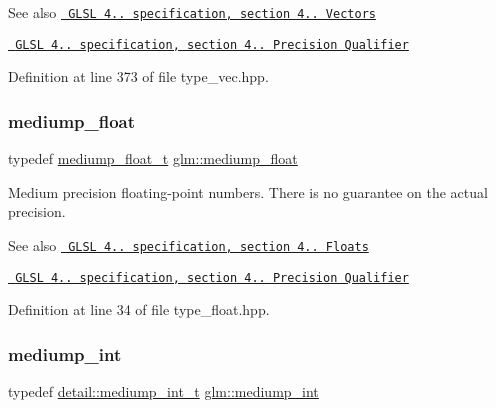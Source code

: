 \begin{DoxySeeAlso}{See also}
\href{http://www.opengl.org/registry/doc/GLSLangSpec.4.20.8.pdf}{\texttt{ G\+L\+SL 4.. specification, section 4.. Vectors}} 

\href{http://www.opengl.org/registry/doc/GLSLangSpec.4.20.8.pdf}{\texttt{ G\+L\+SL 4.. specification, section 4.. Precision Qualifier}} 
\end{DoxySeeAlso}


Definition at line 373 of file type\+\_\+vec.\+hpp.

\mbox{\label{group__core__precision_gac785826c039fe6c97c03b37c81c1a68e}} 
\subsubsection{\texorpdfstring{mediump\_float}{mediump\_float}}
{\footnotesize\ttfamily typedef \mbox{\hyperlink{namespaceglm_aec127979a2b6edbf05b485cb4e8c47cc}{mediump\+\_\+float\+\_\+t}} \mbox{\hyperlink{group__core__precision_gac785826c039fe6c97c03b37c81c1a68e}{glm\+::mediump\+\_\+float}}}

Medium precision floating-\/point numbers. There is no guarantee on the actual precision.

\begin{DoxySeeAlso}{See also}
\href{http://www.opengl.org/registry/doc/GLSLangSpec.4.20.8.pdf}{\texttt{ G\+L\+SL 4.. specification, section 4.. Floats}} 

\href{http://www.opengl.org/registry/doc/GLSLangSpec.4.20.8.pdf}{\texttt{ G\+L\+SL 4.. specification, section 4.. Precision Qualifier}} 
\end{DoxySeeAlso}


Definition at line 34 of file type\+\_\+float.\+hpp.

\mbox{\label{group__core__precision_ga2a3dcbcd7f4e17663d393a12061ac6ac}} 
\subsubsection{\texorpdfstring{mediump\_int}{mediump\_int}}
{\footnotesize\ttfamily typedef \mbox{\hyperlink{namespaceglm_1_1detail_aede0757f19204d1d44f716b3dd66d13c}{detail\+::mediump\+\_\+int\+\_\+t}} \mbox{\hyperlink{group__core__precision_ga2a3dcbcd7f4e17663d393a12061ac6ac}{glm\+::mediump\+\_\+int}}}

